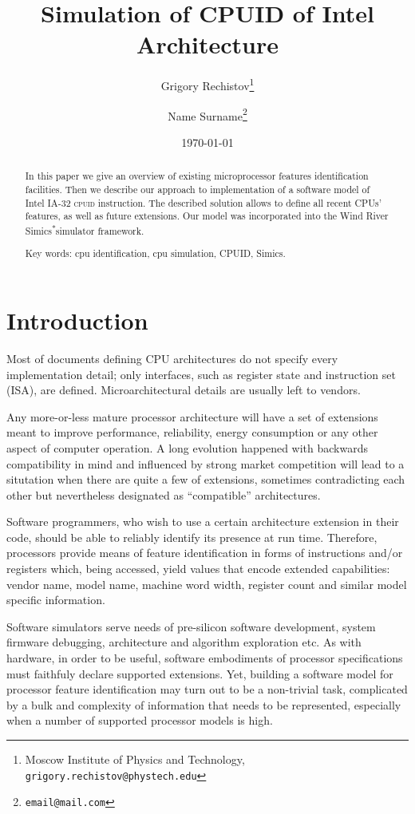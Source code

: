 \documentclass[a4paper,10pt,oneside,unicode]{article}
\author{Grigory Rechistov\thanks{Moscow Institute of Physics and Technology, \texttt{grigory.rechistov@phystech.edu}} \and Name Surname\thanks{\texttt{email@mail.com}}}
\title{Simulation of CPUID of Intel Architecture}
\date{\today}
\newcommand{\cpuid}{\textsc{cpuid} }
\newcommand{\othercopyright}{\textsuperscript{*}}
\begin{document}
\maketitle

\tableofcontents

\begin{abstract}
    
   \noindent In this paper we give an overview of existing microprocessor features identification facilities. Then we describe our approach to implementation of a software model of Intel IA-32 \cpuid instruction. The described solution allows to define all recent {CPUs}' features, as well as future extensions. Our model was incorporated into the Wind River Simics\othercopyright simulator framework.
    
    \noindent Key words: cpu identification, cpu simulation, CPUID, Simics.
\end{abstract}

\section {Introduction}

Most of documents defining CPU architectures do not specify every implementation detail; only interfaces, such as register state and instruction set (ISA), are defined. Microarchitectural details are usually left to vendors.

Any more-or-less mature processor architecture will have a set of extensions meant to improve performance, reliability, energy consumption or any other aspect of computer operation. A long evolution happened with backwards compatibility in mind and influenced by strong market competition will lead to a situtation when there are quite a few of extensions, sometimes contradicting each other but nevertheless designated as “compatible” architectures.

Software programmers, who wish to use a certain architecture extension in their code, should be able to reliably identify its presence at run time. Therefore, processors provide means of feature identification in forms of instructions and/or registers which, being accessed, yield values that encode extended capabilities: vendor name, model name, machine word width, register count and similar model specific information.

Software simulators serve needs of pre-silicon software development, system firmware debugging, architecture and algorithm exploration etc. As with hardware, in order to be useful, software embodiments of processor specifications must faithfuly declare supported extensions. Yet, building a software model for processor feature identification may turn out to be a non-trivial task, complicated by a bulk and complexity of information that needs to be represented, especially when a number of supported processor models is high. 
\end{document}
